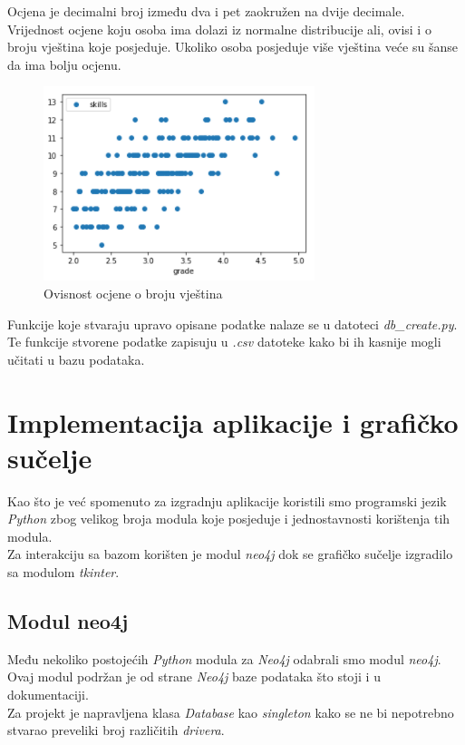 \documentclass[titlepage, 12pt]{scrartcl}
\begin{document}
Ocjena je decimalni broj između dva i pet zaokružen na dvije decimale. Vrijednost ocjene koju osoba ima dolazi iz normalne distribucije ali, ovisi i o broju vještina koje posjeduje. Ukoliko osoba posjeduje više vještina veće su šanse da ima bolju ocjenu.
\begin{figure}[h]
    \centering
    \includegraphics{slike/Grades.png}
    \caption{Ovisnost ocjene o broju vještina}
    \label{fig:hobbies}
\end{figure}

Funkcije koje stvaraju upravo opisane podatke nalaze se u datoteci \emph{db\_create.py}. 
Te funkcije stvorene podatke zapisuju u \emph{.csv} datoteke kako bi ih kasnije mogli učitati u bazu podataka.  
\newpage

\section{Implementacija aplikacije i grafičko sučelje}
Kao što je već spomenuto za izgradnju aplikacije koristili smo programski jezik \emph{Python} zbog velikog broja modula koje posjeduje i jednostavnosti korištenja tih modula. \\
Za interakciju sa bazom korišten je modul \emph{neo4j} dok se grafičko sučelje izgradilo sa modulom \emph{tkinter}.
\subsection{Modul neo4j}
Među nekoliko postojećih \emph{Python} modula za \emph{Neo4j} odabrali smo modul \emph{neo4j}. Ovaj modul podržan je od strane \emph{Neo4j} baze podataka što stoji i u dokumentaciji.\\
Za projekt je napravljena klasa \emph{Database} kao \emph{singleton} kako se ne bi nepotrebno stvarao preveliki broj različitih \emph{drivera}.
\end{document}

